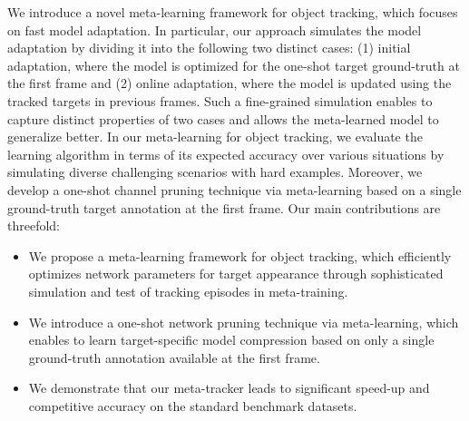 \documentclass[letterpaper]{article} %
\newcommand{\ilchae}[1]{{\color{blue}{IC: #1}}}
\begin{document}
We introduce a novel meta-learning framework for object tracking, which focuses on fast model adaptation.
In particular, our approach simulates the model adaptation by dividing it into the following two distinct cases: (1) initial adaptation, where the model is optimized for the one-shot target ground-truth at the first frame and (2) online adaptation, where the model is updated using the tracked targets in previous frames.
Such a fine-grained simulation enables to capture distinct properties of two cases and allows the meta-learned model to generalize better.
In our meta-learning for object tracking, we evaluate the learning algorithm in terms of its expected accuracy over various situations by simulating diverse challenging scenarios with hard examples. %
Moreover, we develop a one-shot channel pruning technique via meta-learning based on a single ground-truth target annotation at the first frame. 
%
Our main contributions are threefold:
%
\begin{itemize}[label=$\bullet$]
  \item We propose a meta-learning framework for object tracking, which efficiently optimizes network parameters for target appearance through sophisticated simulation and test of tracking episodes in meta-training.
  \item We introduce a one-shot network pruning technique via meta-learning, which enables to learn target-specific model compression based on only a single ground-truth annotation available at the first frame.
  \item We demonstrate that our meta-tracker leads to significant speed-up and competitive accuracy on the standard benchmark datasets.
\end{itemize}
%
\end{document}
